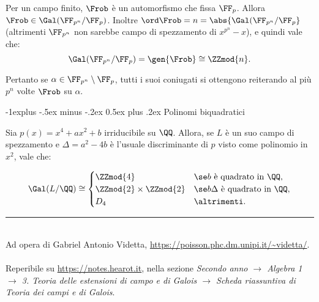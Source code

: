 \documentclass[10pt,landscape]{article}
\makeatletter
\renewcommand{\subsection}{\@startsection{subsection}{2}{0mm}%
	{-1explus -.5ex minus -.2ex}%
	{0.5ex plus .2ex}%
	{\normalfont\normalsize\bfseries}}
\makeatother
\begin{document}
\begin{multicols}{3}
		
		Per un campo finito, $\Frob$ è un automorfismo che
		fissa $\FF_p$. Allora $\Frob \in \Gal(\FF_{p^n} / \FF_p)$. Inoltre $\ord \Frob = n = \abs{\Gal(\FF_{p^n} / \FF_p}$ (altrimenti $\FF_{p^n}$ non sarebbe campo di
		spezzamento di $x^{p^n}-x$), e quindi vale che:
		\[ \Gal(\FF_{p^n} / \FF_p) = \gen{\Frob} \cong \ZZmod{n}. \]
			
		
		Pertanto se $\alpha \in \FF_{p^n} \setminus \FF_p$,
		tutti i suoi coniugati si ottengono reiterando
		al più $p^n$ volte $\Frob$ su $\alpha$.
		
		\subsection{Polinomi biquadratici}
		
		Sia $p(x) = x^4 + ax^2 + b$ irriducibile su $\QQ$.
		Allora, se $L$ è un suo campo di spezzamento e $\Delta = a^2 - 4b$ è l'usuale discriminante di $p$ visto come polinomio in $x^2$, vale che:
		
		\[ \Gal(L / \QQ) \cong \begin{cases}
			\ZZmod{4} & \se b \text{ è quadrato in $\QQ$}, \\
			\ZZmod{2} \times \ZZmod{2} & \se b \Delta \text{ è quadrato in $\QQ$}, \\
			D_4 & \altrimenti.
		\end{cases} \]
		
		
		\vfill
		\hrule
		~\\
		Ad opera di Gabriel Antonio Videtta, \url{https://poisson.phc.dm.unipi.it/~videtta/}.
		~\\Reperibile su
		\url{https://notes.hearot.it}, nella sezione \textit{Secondo anno $\to$ Algebra 1 $\to$ 3. Teoria delle estensioni di campo e di Galois $\to$ Scheda riassuntiva di Teoria dei campi e di Galois}.
	\end{multicols}
	
\end{document}
